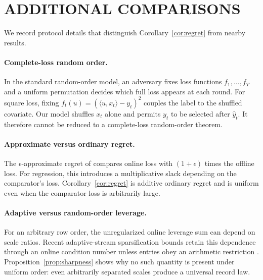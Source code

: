 \section{ADDITIONAL COMPARISONS}

We record protocol details that distinguish Corollary~\ref{cor:regret} from nearby results.

\paragraph{Complete-loss random order.}
In the standard random-order model, an adversary fixes loss functions $f_1,\ldots,f_T$ and a uniform permutation decides which full loss appears at each round. For square loss, fixing $f_t(u)=(\langle u,x_t\rangle-y_t)^2$ couples the label to the shuffled covariate. Our model shuffles $x_t$ alone and permits $y_t$ to be selected after $\widehat y_t$. It therefore cannot be reduced to a complete-loss random-order theorem.

\paragraph{Approximate versus ordinary regret.}
The $\epsilon$-approximate regret of \citet{dong2023batch} compares online loss with $(1+\epsilon)$ times the offline loss. For regression, this introduces a multiplicative slack depending on the comparator's loss. Corollary~\ref{cor:regret} is additive ordinary regret and is uniform even when the comparator loss is arbitrarily large.

\paragraph{Adaptive versus random-order leverage.}
For an arbitrary row order, the unregularized online leverage sum can depend on scale ratios. Recent adaptive-stream sparsification bounds retain this dependence through an online condition number unless entries obey an arithmetic restriction \citep{goranci2026sparsification}. Proposition~\ref{prop:sharpness} shows why no such quantity is present under uniform order: even arbitrarily separated scales produce a universal record law.
